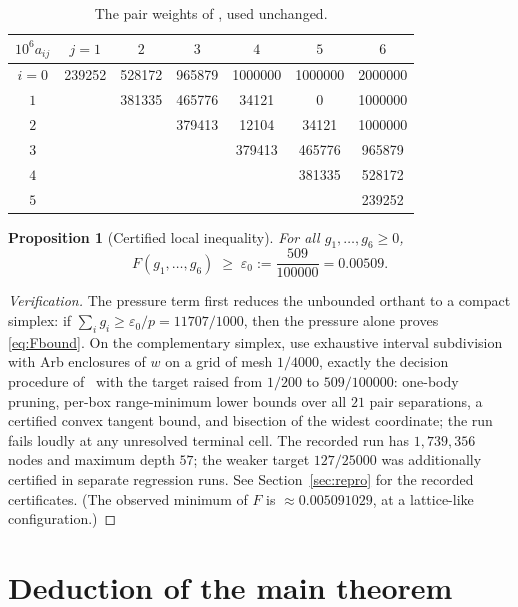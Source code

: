 \documentclass[11pt]{article}
\newtheorem{proposition}[theorem]{Proposition}
\begin{document}
\begin{table}[h]
\centering
\begin{tabular}{ccccccc}
\toprule
$10^6a_{ij}$ & $j=1$ & $2$ & $3$ & $4$ & $5$ & $6$\\
\midrule
$i=0$ & 239252 & 528172 & 965879 & 1000000 & 1000000 & 2000000\\
$1$ & & 381335 & 465776 & 34121 & 0 & 1000000\\
$2$ & & & 379413 & 12104 & 34121 & 1000000\\
$3$ & & & & 379413 & 465776 & 965879\\
$4$ & & & & & 381335 & 528172\\
$5$ & & & & & & 239252\\
\bottomrule
\end{tabular}
\caption{The pair weights of \cite{Trmdy26}, used unchanged.}
\label{tab:weights}
\end{table}

\begin{proposition}[Certified local inequality]\label{prop:F}
For all $g_1,\dots,g_6\ge0$,
\begin{equation}\label{eq:Fbound}
 F(g_1,\dots,g_6)\;\ge\;\varepsilon_0:=\frac{509}{100000}=0.00509 .
\end{equation}
\end{proposition}

\begin{proof}[Verification]
The pressure term first reduces the unbounded orthant to a compact simplex:
if $\sum_i g_i\ge\varepsilon_0/p=11707/1000$, then the pressure alone proves
\eqref{eq:Fbound}.  On the complementary simplex, use exhaustive interval
subdivision with Arb enclosures of $w$ on a grid of mesh
$1/4000$, exactly the decision procedure of~\cite{Trmdy26} with the target
raised from $1/200$ to $509/100000$: one-body pruning, per-box range-minimum
lower bounds over all $21$ pair separations, a certified convex tangent
bound, and bisection of the widest coordinate; the run fails loudly at any
unresolved terminal cell.  The recorded run has $1{,}739{,}356$ nodes and maximum depth $57$; the
weaker target $127/25000$ was additionally certified in separate regression
runs.  See Section~\ref{sec:repro} for the recorded
certificates.  (The observed minimum of $F$ is $\approx0.005091029$, at a
lattice-like configuration.)
\end{proof}

\section{Deduction of the main theorem}\label{sec:deduction}
\end{document}
